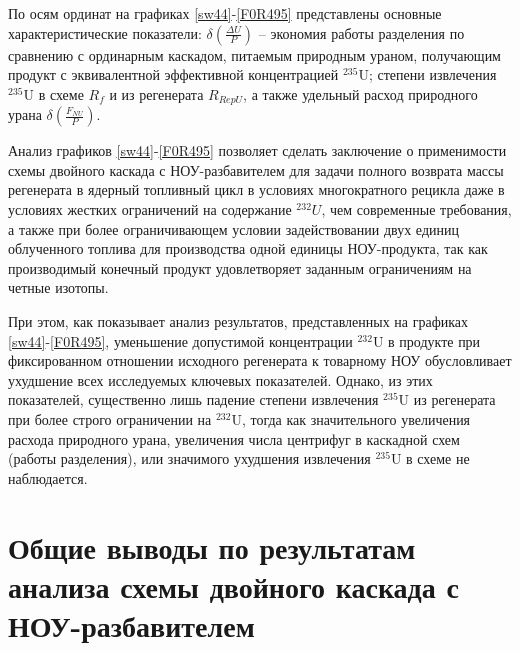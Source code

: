 % 

% 
    
По осям ординат на графиках \ref{sw44}-\ref{F0R495} представлены основные характеристические показатели: $\delta(\frac{\Delta U}{P})$ -- экономия работы разделения по сравнению с ординарным каскадом, питаемым природным ураном, получающим продукт с эквивалентной эффективной концентрацией $^{235}$U; степени извлечения $^{235}$U в схеме $R_f$ и из регенерата $R_{RepU}$, а также удельный расход природного урана $\delta(\frac{F_{NU}}{P})$.

Анализ графиков \ref{sw44}-\ref{F0R495} позволяет сделать заключение о применимости схемы двойного каскада с НОУ-разбавителем для задачи полного возврата массы регенерата в ядерный топливный цикл в условиях многократного рецикла даже в условиях жестких ограничений на содержание $^{232}U$, чем современные требования, а также при более ограничивающем условии задействовании двух единиц облученного топлива для производства одной единицы НОУ-продукта, так как производимый конечный продукт удовлетворяет заданным ограничениям на четные изотопы.

При этом, как показывает анализ результатов, представленных на графиках \ref{sw44}-\ref{F0R495}, уменьшение допустимой концентрации $^{232}$U в продукте при фиксированном отношении исходного регенерата к товарному НОУ обусловливает ухудшение всех исследуемых ключевых показателей. Однако, из этих показателей, существенно лишь падение степени извлечения $^{235}$U из регенерата при более строго ограничении на $^{232}$U, тогда как значительного увеличения расхода природного урана, увеличения числа центрифуг в каскадной схем (работы разделения), или значимого ухудшения извлечения $^{235}$U в схеме не наблюдается.


\section{Общие выводы по результатам анализа схемы двойного каскада с НОУ-разбавителем}

